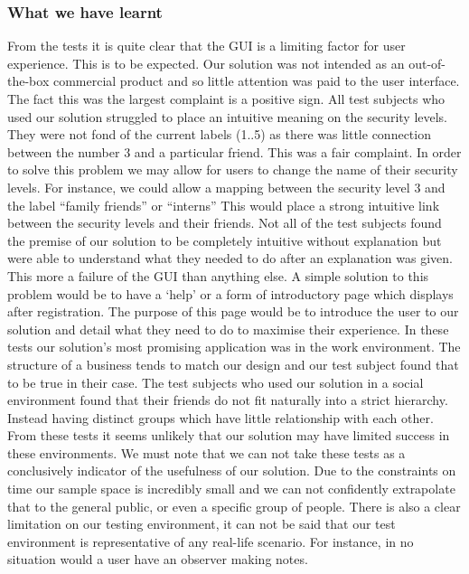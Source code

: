 \documentclass[12pt, titlepage]{article}
\begin{document}
\subsubsection{What we have learnt}
From the tests it is quite clear that the GUI is a limiting factor for user experience. This is to be expected. Our solution was not intended as an out-of-the-box commercial product and so little attention was paid to the user interface. The fact this was the largest complaint is a positive sign.
\newline \indent All test subjects who used our solution struggled to place an intuitive meaning on the security levels. They were not fond of the current labels (1..5) as there was little connection between the number 3 and a particular friend. This was a fair complaint. In order to solve this problem we may allow for users to change the name of their security levels. For instance, we could allow a mapping between the security level 3 and the label ``family friends'' or ``interns'' This would place a strong intuitive link between the security levels and their friends.
\newline \indent Not all of the test subjects found the premise of our solution to be completely intuitive without explanation but were able to understand what they needed to do after an explanation was given. This more a failure of the GUI than anything else. A simple solution to this problem would be to have a `help' or a form of introductory page which displays after registration. The purpose of this page would be to introduce the user to our solution and detail what they need to do to maximise their experience. 
\newline \indent In these tests our solution's most promising application was in the work environment. The structure of a business tends to match our design and our test subject found that to be true in their case. The test subjects who used our solution in a social environment found that their friends do not fit naturally into a strict hierarchy. Instead having distinct groups which have little relationship with each other. From these tests it seems unlikely that our solution may have limited success in these environments.
\newline \indent We must note that we can not take these tests as a conclusively indicator of the usefulness of our solution. Due to the constraints on time our sample space is incredibly small and we can not confidently extrapolate that to the general public, or even a specific group of people. There is also a clear limitation on our testing environment, it can not be said that our test environment is representative of any real-life scenario. For instance, in no situation would a user have an observer making notes.
\end{document}
